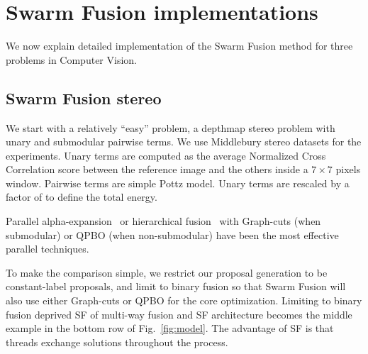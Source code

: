 \section{Swarm Fusion implementations} 
We now explain detailed implementation of the Swarm Fusion method for
three problems in Computer Vision.

\subsection{Swarm Fusion stereo}
We start with a relatively ``easy'' problem, a depthmap stereo problem
with unary and submodular pairwise terms.
%
We use Middlebury stereo datasets for the experiments. Unary terms are
computed as the average Normalized Cross Correlation score between the
reference image and the others inside a $7\times 7$ pixels
window. Pairwise terms are simple Pottz model. Unary terms are rescaled
by a factor of  to define the total energy.



\noindent
Parallel alpha-expansion~\cite{delong} or hierarchical
fusion~\cite{delong,olga} with Graph-cuts (when submodular) or QPBO
(when non-submodular) have been the most effective parallel techniques.
%


\noindent
To make the comparison simple, we restrict our proposal generation to be
constant-label proposals, and limit to binary fusion so that Swarm
Fusion will also use either Graph-cuts or QPBO for the core
optimization. Limiting to binary fusion deprived SF of multi-way fusion
and SF architecture becomes the middle example in the bottom row of
Fig.~\ref{fig:model}.
%
The advantage of SF is that threads exchange solutions throughout the
process.
